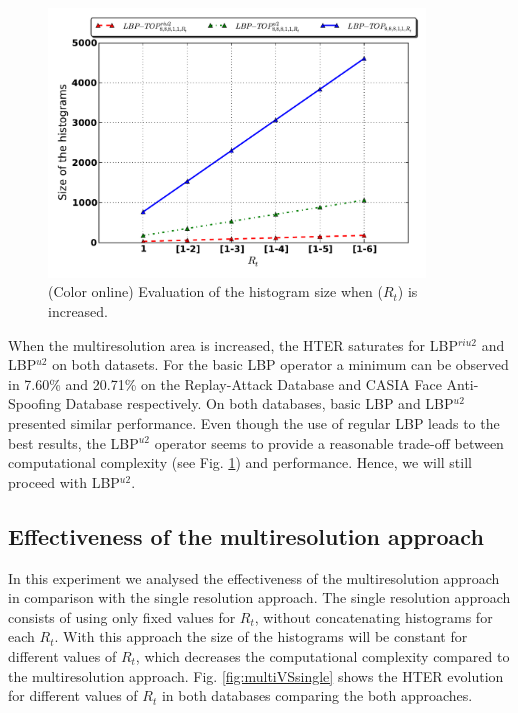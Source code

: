 \begin{figure}[!btb]
\begin{center}
\includegraphics [width=10cm] {images/proposed_countermeasure/dimIncrease.pdf}
\caption{(Color online) Evaluation of the histogram size when ($R_t$) is increased.} 
\label{fig:dimIncrease}
\end{center}
\end{figure}

When the multiresolution area is increased, the HTER saturates for LBP$^{riu2}$ and LBP$^{u2}$ on both datasets. For the basic LBP operator a minimum can be observed in 7.60\% and 20.71\% on the Replay-Attack Database and CASIA Face Anti-Spoofing Database respectively. On both databases, basic LBP and LBP$^{u2}$ presented similar performance. Even though the use of regular LBP leads to the best results, the LBP$^{u2}$ operator seems to provide a reasonable trade-off between computational complexity (see Fig. \ref{fig:dimIncrease}) and performance. Hence, we will still proceed with LBP$^{u2}$.

\subsection{Effectiveness of the multiresolution approach}
\label{sec_multiresolution}

In this experiment we analysed the effectiveness of the multiresolution approach in comparison with the single resolution approach. The single resolution approach consists of using only fixed values for $R_t$, without concatenating histograms for each $R_t$. With this approach the size of the histograms will be constant for different values of $R_t$, which decreases the computational complexity compared to the multiresolution approach. Fig. \ref{fig:multiVSsingle} shows the HTER evolution for different values of $R_t$ in both databases comparing the both approaches.

